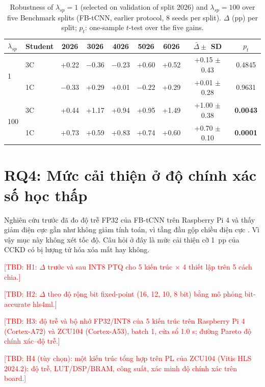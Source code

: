 \documentclass[10pt]{article} %
\newcommand{\tbd}[1]{\textcolor{red}{[TBD: #1]}}
\begin{document}
\begin{table}[h]
\caption{Robustness of $\lambda_{sp}=1$ (selected on validation of split 2026) and $\lambda_{sp}=100$ over five Benchmark splits (FB-tCNN, earlier protocol, 8 seeds per split). $\Delta$ (pp) per split; $p_t$: one-sample $t$-test over the five gains.}
\label{tab:lambda_robust}
\begin{center}
\footnotesize
\begin{tabular}{llccccccc}
\toprule
$\lambda_{sp}$ & Student & 2026 & 3026 & 4026 & 5026 & 6026 & $\bar\Delta \pm$ SD & $p_t$ \\
\midrule
\multirow{2}{*}{1} & 3C & +0.22 & $-0.36$ & $-0.23$ & +0.60 & +0.52 & +0.15 $\pm$ 0.43 & 0.4845 \\
 & 1C & $-0.33$ & +0.29 & +0.01 & $-0.22$ & +0.29 & +0.01 $\pm$ 0.28 & 0.9631 \\
\multirow{2}{*}{100} & 3C & +0.44 & +1.17 & +0.94 & +0.95 & +1.49 & +1.00 $\pm$ 0.38 & \textbf{0.0043} \\
 & 1C & +0.73 & +0.59 & +0.83 & +0.74 & +0.60 & +0.70 $\pm$ 0.10 & \textbf{0.0001} \\
\bottomrule
\end{tabular}
\end{center}
\end{table}

\section{RQ4: Mức cải thiện ở độ chính xác số học thấp}
\label{sec:rq4}
\label{sec:pi4}

Nghiên cứu trước đã đo độ trễ FP32 của FB-tCNN trên Raspberry Pi 4 và thấy giảm điện cực gần như không giảm tính toán, vì tầng đầu gộp chiều điện cực \citep{icera2026cckd}. Vì vậy mục này không xét tốc độ. Câu hỏi ở đây là mức cải thiện cỡ 1~pp của CCKD có bị lượng tử hóa xóa mất hay không.

\tbd{H1: $\Delta$ trước và sau INT8 PTQ cho 5 kiến trúc $\times$ 4 thiết lập trên 5 cách chia.}

\tbd{H2: $\Delta$ theo độ rộng bit fixed-point (16, 12, 10, 8 bit) bằng mô phỏng bit-accurate hls4ml.}

\tbd{H3: độ trễ và bộ nhớ FP32/INT8 của 5 kiến trúc trên Raspberry Pi 4 (Cortex-A72) và ZCU104 (Cortex-A53), batch 1, cửa sổ 1.0 s; đường Pareto độ chính xác--độ trễ.}

\tbd{H4 (tùy chọn): một kiến trúc tổng hợp trên PL của ZCU104 (Vitis HLS 2024.2): độ trễ, LUT/DSP/BRAM, công suất, xác minh độ chính xác trên board.}
\end{document}
